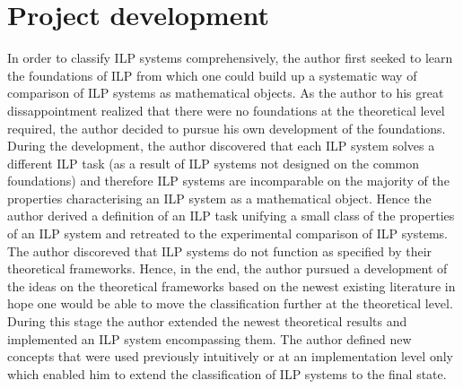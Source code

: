 \section{Project development}
In order to classify ILP systems comprehensively, the author first seeked to learn the foundations of ILP from which one could build up a systematic way of comparison of ILP systems as mathematical objects. As the author to his great dissappointment realized that there were no foundations at the theoretical level required, the author decided to pursue his own development of the foundations. During the development, the author discovered that each ILP system solves a different ILP task (as a result of ILP systems not designed on the common foundations) and therefore ILP systems are incomparable on the majority of the properties characterising an ILP system as a mathematical object. Hence the author derived a definition of an ILP task unifying a small class of the properties of an ILP system and retreated to the experimental comparison of ILP systems. The author discoreved that ILP systems do not function as specified by their theoretical frameworks. Hence, in the end, the author pursued a development of the ideas on the theoretical frameworks based on the newest existing literature in hope one would be able to move the classification further at the theoretical level. During this stage the author extended the newest theoretical results and implemented an ILP system encompassing them. The author defined new concepts that were used previously intuitively or at an implementation level only which enabled him to extend the classification of ILP systems to the final state.
